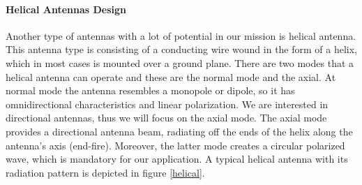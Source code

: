 \paragraph{Helical Antennas Design}
Another type of antennas with a lot of potential in our mission is helical antenna. This antenna type is consisting of a conducting wire wound in the form of a helix, which in most cases is mounted over a ground plane. There are two modes that a helical antenna can operate and these are the normal mode and the axial. At normal mode the antenna resembles a monopole or dipole, so it has omnidirectional characteristics and linear polarization. We are interested in directional antennas, thus we will focus on the axial mode. The axial mode provides a directional antenna beam, radiating off the ends of the helix along the antenna's axis (end-fire). Moreover, the latter mode creates a circular polarized wave, which is mandatory for our application. A typical helical antenna with its radiation pattern is depicted in figure \ref{helical}.

